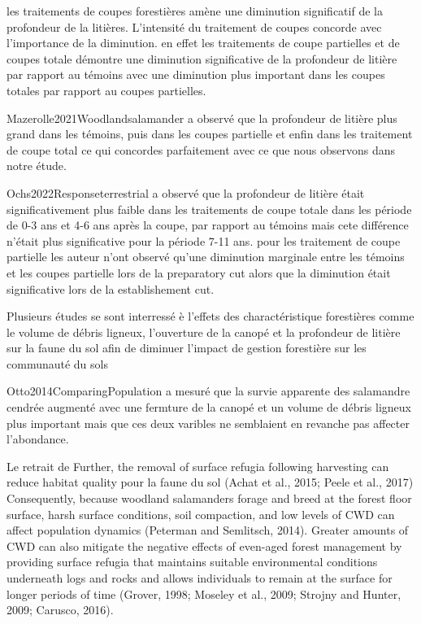 
les traitements de coupes forestières amène une diminution significatif de la profondeur de la litières. 
L'intensité du traitement de coupes concorde avec l'importance de la diminution. 
en effet les traitements de coupe partielles et de coupes totale démontre une diminution significative de la profondeur de litière par rapport au témoins 
avec une diminution plus important dans les coupes totales par rapport au coupes partielles.

Mazerolle2021Woodlandsalamander a observé que la profondeur de litière plus grand dans les témoins, puis dans les coupes partielle 
et enfin dans les traitement de coupe total ce qui concordes parfaitement avec ce que nous observons dans notre étude.

Ochs2022Responseterrestrial a observé que la profondeur de litière était significativement plus faible dans les traitements de coupe totale dans les période de 0-3 ans et 4-6 ans après la coupe, par rapport au témoins mais cete différence n'était plus significative pour la période 7-11 ans. 
pour les traitement de coupe partielle les auteur n'ont observé qu'une diminution marginale entre les témoins et les coupes partielle lors de la preparatory cut alors que la diminution était significative lors de la establishement cut.



Plusieurs études se sont interressé è l'effets des charactéristique forestières comme le volume de débris ligneux, l'ouverture de la canopé et la profondeur de litière sur la faune du sol afin de diminuer l'impact de gestion forestière sur les communauté du sols \citep{Semlitsch2002Criticalelements,McKenny2006Effectsstructural}

Otto2014ComparingPopulation a mesuré que la survie apparente des salamandre cendrée augmenté avec une fermture de la canopé et un volume de débris ligneux plus important mais que ces deux varibles ne semblaient en revanche pas affecter l'abondance. 

Le retrait de 
Further, the removal of surface refugia following harvesting can reduce habitat quality pour la faune du sol (Achat et al., 2015; Peele et al., 2017)
Consequently, because woodland salamanders forage and breed at the forest floor surface, harsh surface conditions, soil compaction, and low levels of CWD can affect population dynamics (Peterman and Semlitsch, 2014).
Greater amounts of CWD can also mitigate the negative effects of even-aged forest management by providing surface refugia that maintains suitable environmental conditions underneath logs and rocks and allows individuals to remain at the surface for longer periods of time (Grover, 1998; Moseley et al., 2009; Strojny and Hunter, 2009; Carusco, 2016).

